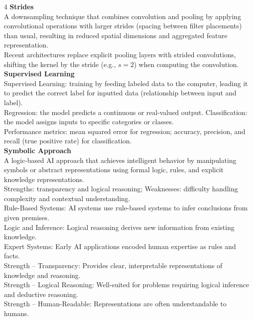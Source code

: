 \documentclass[8pt]{extarticle}
\begin{document}
\begin{multicols}{4}
\vspace{2pt}\textbf{Strides}\\
A downsampling technique that combines convolution and pooling by applying convolutional operations with larger strides (spacing between filter placements) than usual, resulting in reduced spatial dimensions and aggregated feature representation.\\
Recent architectures replace explicit pooling layers with strided convolutions, shifting the kernel by the stride (e.g., $s = 2$) when computing the convolution.\\
\vspace{2pt}\textbf{Supervised Learning}\\
Supervised Learning: training by feeding labeled data to the computer, leading it to predict the correct label for inputted data (relationship between input and label).\\
Regression: the model predicts a continuous or real-valued output. Classification: the model assigns inputs to specific categories or classes.\\
Performance metrics: mean squared error for regression; accuracy, precision, and recall (true positive rate) for classification.\\
\vspace{2pt}\textbf{Symbolic Approach}\\
A logic-based AI approach that achieves intelligent behavior by manipulating symbols or abstract representations using formal logic, rules, and explicit knowledge representations.\\
Strengths: transparency and logical reasoning; Weaknesses: difficulty handling complexity and contextual understanding.\\
Rule-Based Systems: AI systems use rule-based systems to infer conclusions from given premises.\\
Logic and Inference: Logical reasoning derives new information from existing knowledge.\\
Expert Systems: Early AI applications encoded human expertise as rules and facts.\\
Strength -- Transparency: Provides clear, interpretable representations of knowledge and reasoning.\\
Strength -- Logical Reasoning: Well-suited for problems requiring logical inference and deductive reasoning.\\
Strength -- Human-Readable: Representations are often understandable to humans.\\

\end{multicols}
\end{document}
